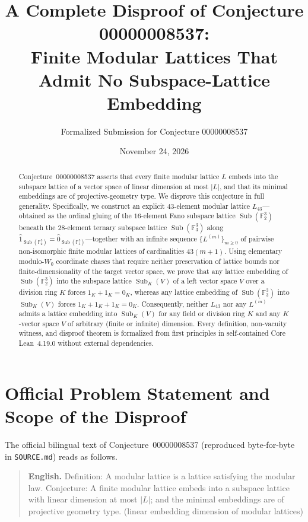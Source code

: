 \documentclass[11pt]{article}
\title{\textbf{A Complete Disproof of Conjecture 00000008537:\\
Finite Modular Lattices That Admit No Subspace-Lattice Embedding}}
\author{Formalized Submission for Conjecture 00000008537}
\date{November 24, 2026}
\theoremstyle{definition}
\newcommand{\Sub}{\operatorname{Sub}}
\newcommand{\FF}{\mathbb{F}}
\begin{document}
\maketitle

\begin{abstract}
Conjecture~00000008537 asserts that every finite modular lattice $L$ embeds into the
subspace lattice of a vector space of linear dimension at most $|L|$, and that its
minimal embeddings are of projective-geometry type. We disprove this conjecture in full
generality. Specifically, we construct an explicit $43$-element modular lattice
$L_{43}$---obtained as the ordinal gluing of the $16$-element Fano subspace lattice
$\Sub(\FF_2^3)$ beneath the $28$-element ternary subspace lattice $\Sub(\FF_3^3)$ along
$\hat{1}_{\Sub(\FF_2^3)} = \hat{0}_{\Sub(\FF_3^3)}$---together with an infinite sequence
$\{L^{(m)}\}_{m \ge 0}$ of pairwise non-isomorphic finite modular lattices of
cardinalities $43(m+1)$. Using elementary modulo-$W_0$ coordinate chases that require
neither preservation of lattice bounds nor finite-dimensionality of the target vector
space, we prove that any lattice embedding of $\Sub(\FF_2^3)$ into the subspace lattice
$\Sub_K(V)$ of a left vector space $V$ over a division ring $K$ forces $1_K + 1_K = 0_K$,
whereas any lattice embedding of $\Sub(\FF_3^3)$ into $\Sub_K(V)$ forces
$1_K + 1_K + 1_K = 0_K$. Consequently, neither $L_{43}$ nor any $L^{(m)}$ admits a
lattice embedding into $\Sub_K(V)$ for any field or division ring $K$ and any
$K$-vector space $V$ of arbitrary (finite or infinite) dimension. Every definition,
non-vacuity witness, and disproof theorem is formalized from first principles in
self-contained Core Lean~4.19.0 without external dependencies.
\end{abstract}

\section{Official Problem Statement and Scope of the Disproof}

The official bilingual text of Conjecture~00000008537 (reproduced byte-for-byte in
\texttt{SOURCE.md}) reads as follows.

\begin{quote}
\textbf{English.} Definition: A modular lattice is a lattice satisfying the modular law.
Conjecture: A finite modular lattice embeds into a subspace lattice with linear
dimension at most $|L|$; and the minimal embeddings are of projective geometry type.
(linear embedding dimension of modular lattices)
\end{quote}
\end{document}
